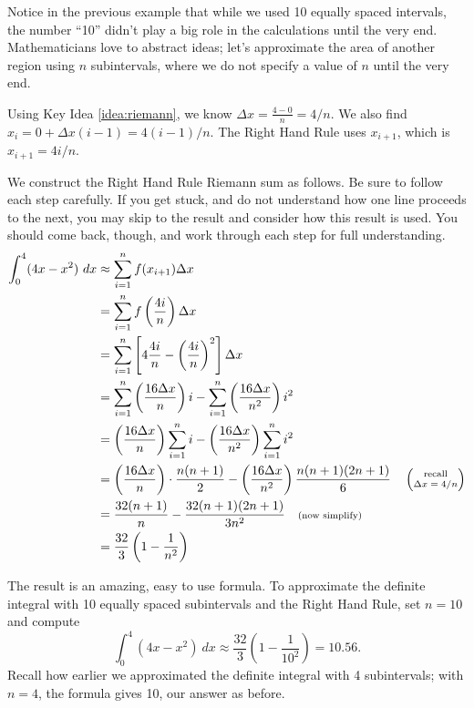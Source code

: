 Notice in the previous example that while we used 10 equally spaced intervals, the number ``10'' didn't play a big role in the calculations until the very end. Mathematicians love to abstract ideas; let's approximate the area of another region using $n$ subintervals, where we do not specify a value of $n$ until the very end.\\

{Using Key Idea \ref{idea:riemann}, we know $\Delta x = \frac{4-0}{n} = 4/n$. We also find $x_i = 0 + \Delta x(i-1) = 4(i-1)/n$. The Right Hand Rule uses $x_{i+1}$, which is $x_{i+1} = 4i/n$.

We construct the Right Hand Rule Riemann sum as follows. Be sure to follow each step carefully. If you get stuck, and do not understand how one line proceeds to the next, you may skip to the result and consider how this result is used. You should come back, though, and work through each step for full understanding.
\begin{align*}
		\int_0^4(4x-x^2)\ dx &\approx \sum_{i=1}^n f(x_{i+1})\Delta x \\
											&= \sum_{i=1}^n f\left(\frac{4i}{n}\right) \Delta x \\
											&=	\sum_{i=1}^n \left[4\frac{4i}n-\left(\frac{4i}n\right)^2\right]\Delta x\\
											&=	\sum_{i=1}^n \left(\frac{16\Delta x}{n}\right)i - \sum_{i=1}^n \left(\frac{16\Delta x}{n^2}\right)i^2 \\
											&=	\left(\frac{16\Delta x}{n}\right)\sum_{i=1}^n i - \left(\frac{16\Delta x}{n^2}\right)\sum_{i=1}^n i^2  \\
											&= \left(\frac{16\Delta x}{n}\right)\cdot \frac{n(n+1)}{2} - \left(\frac{16\Delta x}{n^2}\right)\frac{n(n+1)(2n+1)}{6} \quad \left(\parbox{35pt}{\scriptsize \centering recall $\Delta x = 4/n$}\right)\\
											&=\frac{32(n+1)}{n} - \frac{32(n+1)(2n+1)}{3n^2} \quad \text{\scriptsize (now simplify)} \\
											&= \frac{32}{3}\left(1-\frac{1}{n^2}\right)
\end{align*}
\drawexampleline

The result is an amazing, easy to use formula. To approximate the definite integral with 10 equally spaced subintervals and the Right Hand Rule, set $n=10$ and compute $$\int_0^4 (4x-x^2)\ dx \approx \frac{32}{3}\left(1-\frac{1}{10^2}\right) = 10.56.$$
Recall how earlier we approximated the definite integral with 4 subintervals; with $n=4$, the formula gives 10, our answer as before.

}
